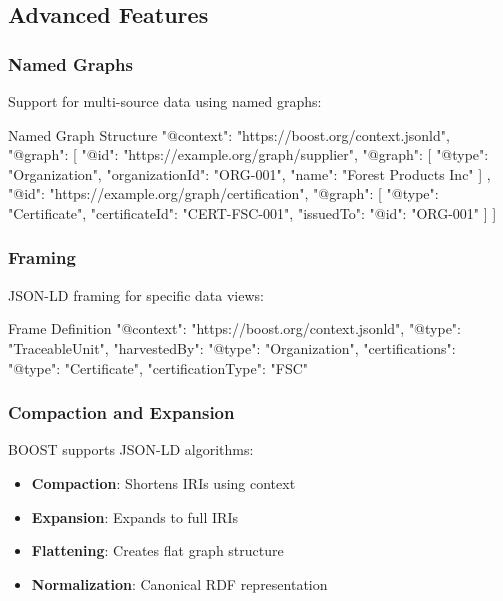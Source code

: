 \subsection{Advanced Features}
\label{sec:jsonld-advanced}

\subsubsection{Named Graphs}

Support for multi-source data using named graphs:

\begin{jsonexample}{Named Graph Structure}
{
  "@context": "https://boost.org/context.jsonld",
  "@graph": [{
    "@id": "https://example.org/graph/supplier",
    "@graph": [
      {
        "@type": "Organization",
        "organizationId": "ORG-001",
        "name": "Forest Products Inc"
      }
    ]
  }, {
    "@id": "https://example.org/graph/certification",
    "@graph": [
      {
        "@type": "Certificate",
        "certificateId": "CERT-FSC-001",
        "issuedTo": {"@id": "ORG-001"}
      }
    ]
  }]
}
\end{jsonexample}

\subsubsection{Framing}

JSON-LD framing for specific data views:

\begin{jsonexample}{Frame Definition}
{
  "@context": "https://boost.org/context.jsonld",
  "@type": "TraceableUnit",
  "harvestedBy": {
    "@type": "Organization",
    "certifications": {
      "@type": "Certificate",
      "certificationType": "FSC"
    }
  }
}
\end{jsonexample}

\subsubsection{Compaction and Expansion}

BOOST supports JSON-LD algorithms:

\begin{itemize}
    \item \textbf{Compaction}: Shortens IRIs using context
    \item \textbf{Expansion}: Expands to full IRIs
    \item \textbf{Flattening}: Creates flat graph structure
    \item \textbf{Normalization}: Canonical RDF representation
\end{itemize}

